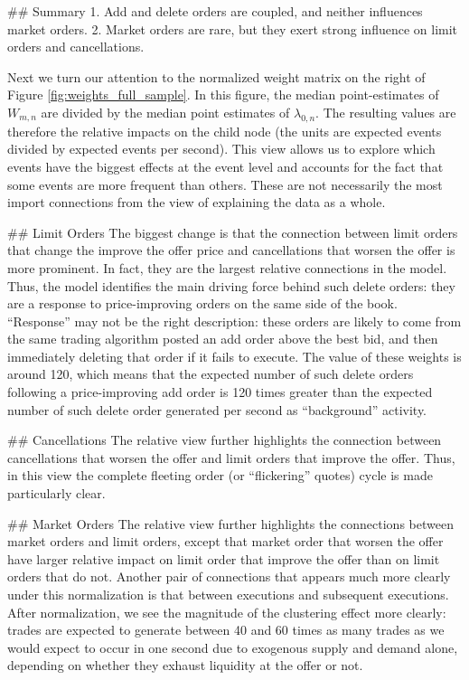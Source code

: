 		\#\# Summary
		1. Add and delete orders are coupled, and neither influences market orders.
		2. Market orders are rare, but they exert strong influence on limit orders and cancellations.


		Next we turn our attention to the normalized weight matrix on the right of Figure \ref{fig:weights_full_sample}. In this figure, the median point-estimates of $W_{m,n}$ are divided by the median point estimates of $\lambda_{0,n}$. The resulting values are therefore the relative impacts on the child node (the units are expected events divided by expected events per second). This view allows us to explore which events have the biggest effects at the event level and accounts for the fact that some events are more frequent than others. These are not necessarily the most import connections from the view of explaining the data as a whole.

		\#\# Limit Orders
		The biggest change is that the connection between limit orders that change the improve the offer price and cancellations that worsen the offer is more prominent. In fact, they are the largest relative connections in the model. Thus, the model identifies the main driving force behind such delete orders: they are a response to price-improving orders on the same side of the book. “Response” may not be the right description: these orders are likely to come from the same trading algorithm posted an add order above the best bid, and then immediately deleting that order if it fails to execute. The value of these weights is around 120, which means that the expected number of such delete orders following a price-improving add order is 120 times greater than the expected number of such delete order generated per second as “background” activity.

		\#\# Cancellations
		The relative view further highlights the connection between cancellations that worsen the offer and limit orders that improve the offer. Thus, in this view the complete fleeting order (or ``flickering'' quotes) cycle is made particularly clear.

		\#\# Market Orders
		The relative view further highlights the connections between market orders and limit orders, except that market order that worsen the offer have larger relative impact on limit order that improve the offer than on limit orders that do not. Another pair of connections that appears much more clearly under this normalization is that between executions and subsequent executions. After normalization, we see the magnitude of the clustering effect more clearly: trades are expected to generate between 40 and 60 times as many trades as we would expect to occur in one second due to exogenous supply and demand alone, depending on whether they exhaust liquidity at the offer or not.

